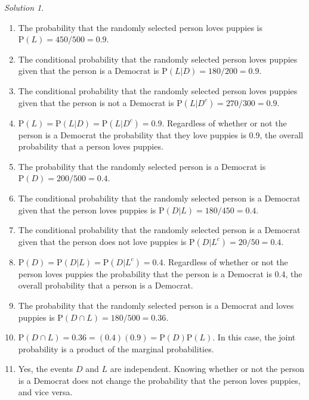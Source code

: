 \documentclass[
  letterpaper,
  DIV=11,
  numbers=noendperiod]{scrreprt}
\providecommand{\tightlist}{%
  \setlength{\itemsep}{0pt}\setlength{\parskip}{0pt}}
\theoremstyle{plain}
\theoremstyle{definition}
\theoremstyle{definition}
\theoremstyle{definition}
\theoremstyle{remark}
\newtheorem{refsolution}{Solution}[chapter]
\begin{document}
\begin{tcolorbox}[enhanced jigsaw, opacityback=0, rightrule=.15mm, coltitle=black, colframe=quarto-callout-tip-color-frame, toprule=.15mm, colbacktitle=quarto-callout-tip-color!10!white, opacitybacktitle=0.6, left=2mm, toptitle=1mm, breakable, title={Solution (click to expand)}, bottomtitle=1mm, colback=white, leftrule=.75mm, titlerule=0mm, arc=.35mm, bottomrule=.15mm]

\begin{refsolution}
\leavevmode

\begin{enumerate}
\def\labelenumi{\arabic{enumi}.}
\tightlist
\item
  The probability that the randomly selected person loves puppies is
  \(\textrm{P}(L)=450/500=0.9\).
\item
  The conditional probability that the randomly selected person loves
  puppies given that the person is a Democrat is
  \(\textrm{P}(L|D)=180/200=0.9\).
\item
  The conditional probability that the randomly selected person loves
  puppies given that the person is not a Democrat is
  \(\textrm{P}(L|D^c)=270/300=0.9\).
\item
  \(\textrm{P}(L)=\textrm{P}(L|D)=\textrm{P}(L|D^c)=0.9\). Regardless of
  whether or not the person is a Democrat the probability that they love
  puppies is 0.9, the overall probability that a person loves puppies.
\item
  The probability that the randomly selected person is a Democrat is
  \(\textrm{P}(D)=200/500=0.4\).
\item
  The conditional probability that the randomly selected person is a
  Democrat given that the person loves puppies is
  \(\textrm{P}(D|L)=180/450=0.4\).
\item
  The conditional probability that the randomly selected person is a
  Democrat given that the person does not love puppies is
  \(\textrm{P}(D|L^c)=20/50=0.4\).
\item
  \(\textrm{P}(D)=\textrm{P}(D|L)=\textrm{P}(D|L^c)=0.4\). Regardless of
  whether or not the person loves puppies the probability that the
  person is a Democrat is 0.4, the overall probability that a person is
  a Democrat.
\item
  The probability that the randomly selected person is a Democrat and
  loves puppies is \(\textrm{P}(D \cap L)=180/500=0.36\).
\item
  \(\textrm{P}(D \cap L) = 0.36 = (0.4)(0.9)=\textrm{P}(D)\textrm{P}(L)\).
  In this case, the joint probability is a product of the marginal
  probabilities.
\item
  Yes, the events \(D\) and \(L\) are independent. Knowing whether or
  not the person is a Democrat does not change the probability that the
  person loves puppies, and vice versa.
\end{enumerate}

\label{sol-puppy}

\end{refsolution}

\end{tcolorbox}
\end{document}
